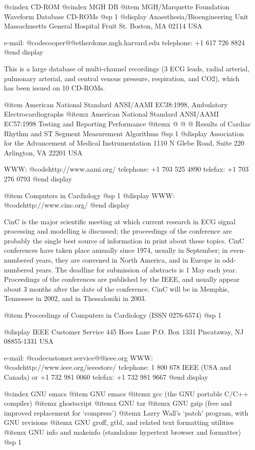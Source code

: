 {{{{{{{{{@cindex CD-ROM
@cindex MGH DB
@item MGH/Marquette Foundation Waveform Database CD-ROMs
@sp 1
@display
Anaesthesia/Bioengineering Unit
Massachusetts General Hospital
Fruit St.
Boston, MA 02114 USA

e-mail: @code{cooper@@etherdome.mgh.harvard.edu}
telephone: +1 617 726 8824
@end display

This is a large database of multi-channel recordings (3 ECG leads, radial
arterial, pulmonary arterial, and central venous pressure, respiration,
and CO2), which has been issued on 10 CD-ROMs.

@item American National Standard ANSI/AAMI EC38:1998, Ambulatory Electrocardiographs
@itemx American National Standard ANSI/AAMI EC57:1998 Testing and Reporting Performance
@itemx @ @ @ Results of Cardiac Rhythm and ST Segment Measurement Algorithms
@sp 1
@display
Association for the Advancement of Medical Instrumentation
1110 N Glebe Road, Suite 220
Arlington, VA 22201 USA

WWW: @code{http://www.aami.org/}
telephone: +1 703 525 4890
telefax: +1 703 276 0793
@end display

@item Computers in Cardiology
@sp 1
@display
WWW: @code{http://www.cinc.org/}
@end display

CinC is the major scientific meeting at which current research in ECG signal
processing and modelling is discussed;  the proceedings of the conference are
probably the single best source of information in print about these topics.
CinC conferences have taken place annually since 1974, usually in September;
in even-numbered years, they are convened in North America, and in Europe in
odd-numbered years.  The deadline for submission of abstracts is 1 May each
year.  Proceedings of the conferences are published by the IEEE, and
usually appear about 3 months after the date of the conference.  CinC will be
in Memphis, Tennessee in 2002, and in Thessaloniki in 2003.

@item Proceedings of Computers in Cardiology (ISSN 0276-6574)
@sp 1

@display
IEEE Customer Service
445 Hoes Lane
P.O. Box 1331
Piscataway, NJ 08855-1331 USA

e-mail: @code{customer.service@@ieee.org}
WWW: @code{http://www.ieee.org/ieeestore/}
telephone: 1 800 678 IEEE (USA and Canada) or +1 732 981 0060
telefax: +1 732 981 9667
@end display

@cindex GNU emacs
@item GNU emacs
@itemx gcc (the GNU portable C/C++ compiler)
@itemx ghostscript
@itemx GNU tar
@itemx GNU gzip (free and improved replacement for `compress')
@itemx Larry Wall's `patch' program, with GNU revisions
@itemx GNU groff, gtbl, and related text formatting utilities
@itemx GNU info and makeinfo (standalone hypertext browser and formatter)
@sp 1

}}}}}}}}}
